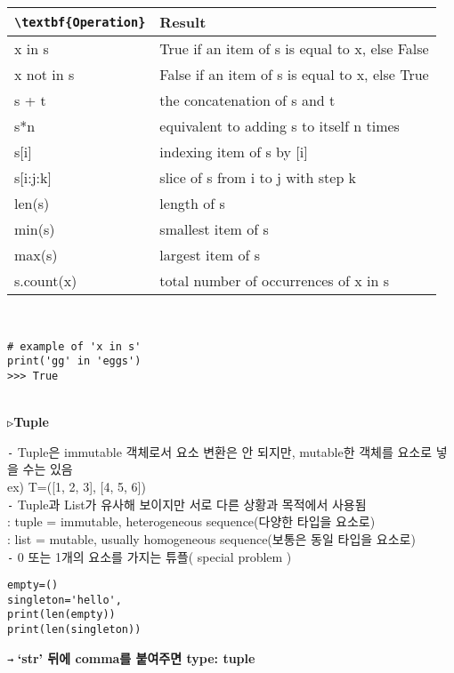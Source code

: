 \documentclass[11pt,a4paper]{article}
\begin{document}
\begin{tabular}{|>{\centering\arraybackslash}m{4cm}|>{\centering\arraybackslash}m{6cm}|}
\hline
\rowcolors[gray]{0.9}
\verb|\textbf{Operation}| & \textbf{Result} \\
\hline
x in s & True if an item of s is equal to x, else False \\
\hline
x not in s & False if an item of s is equal to x, else True \\
\hline
s + t & the concatenation of s and t \\
\hline
s*n & equivalent to adding s to itself n times \\
\hline
s[i] & indexing item of s by [i] \\
\hline
s[i:j:k] & slice of s from i to j with step k \\
\hline
len(s) & length of s \\
\hline
min(s) & smallest item of s \\
\hline
max(s) & largest item of s \\
\hline
s.count(x) & total number of occurrences of x in s \\
\hline
\end{tabular}\\
\begin{lstlisting}[label={list:first}]
# example of 'x in s'
print('gg' in 'eggs')
>>> True
\end{lstlisting}\\

\texttt{▷}\textbf{Tuple}\\
\begin{spacing}{1.5}
\texttt{-} Tuple은 immutable 객체로서 요소 변환은 안 되지만, mutable한 객체를 요소로 넣을 수는 있음\\
ex) T=([1, 2, 3], [4, 5, 6])\\

\texttt{-} Tuple과 List가 유사해 보이지만 서로 다른 상황과 목적에서 사용됨\\
\hspace*{1em} : tuple = immutable, heterogeneous sequence(다양한 타입을 요소로)\\
\hspace*{1em} : list = mutable, usually homogeneous sequence(보통은 동일 타입을 요소로)\\
\texttt{-} 0 또는 1개의 요소를 가지는 튜플( special problem )
\end{spacing}
\begin{lstlisting}[label={list:first}]
empty=()
singleton='hello',
print(len(empty))
print(len(singleton))
\end{lstlisting}
\texttt{→} \textbf{`str' 뒤에 comma를 붙여주면 type: tuple}
\end{document}
